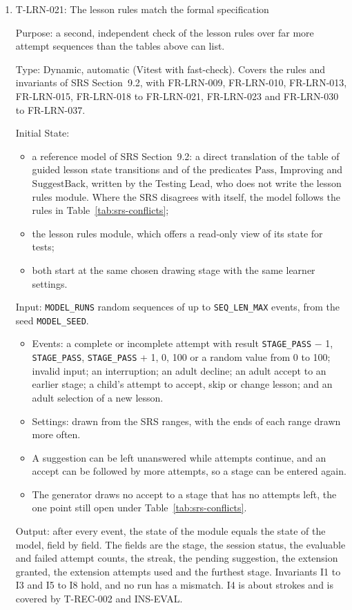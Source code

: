 \documentclass[12pt, titlepage]{article}
\newcommand{\testitem}[1]{\item #1\par\nopagebreak}
\begin{document}
\begin{enumerate}
\testitem{T-LRN-021: The lesson rules match the formal specification}

Purpose: a second, independent check of the lesson rules over far more
attempt sequences than the tables above can list.

Type: Dynamic, automatic (Vitest with fast-check). Covers the rules and
invariants of SRS Section~9.2, with FR-LRN-009, FR-LRN-010, FR-LRN-013,
FR-LRN-015, FR-LRN-018 to FR-LRN-021, FR-LRN-023 and FR-LRN-030 to
FR-LRN-037.

Initial State:
\begin{itemize}
\item a reference model of SRS Section~9.2: a direct translation of the
table of guided lesson state transitions and of the predicates
$\mathrm{Pass}$, $\mathrm{Improving}$ and
$\mathrm{SuggestBack}$, written by the Testing Lead, who does not
write the lesson rules module. Where the SRS disagrees with itself, the
model follows the rules in Table~\ref{tab:srs-conflicts};
\item the lesson rules module, which offers a read-only view of its state
for tests;
\item both start at the same chosen drawing stage with the same learner
settings.
\end{itemize}

Input: \texttt{MODEL\_RUNS} random sequences of up to
\texttt{SEQ\_LEN\_MAX} events, from the seed \texttt{MODEL\_SEED}.
\begin{itemize}
\item Events: a complete or incomplete attempt with result
\texttt{STAGE\_PASS} $-$ 1, \texttt{STAGE\_PASS}, \texttt{STAGE\_PASS} + 1,
0, 100 or a random value from 0 to 100; invalid input; an interruption; an
adult decline; an adult accept to an earlier stage; a child's attempt to
accept, skip or change lesson; and an adult selection of a new lesson.
\item Settings: drawn from the SRS ranges, with the ends of each range
drawn more often.
\item A suggestion can be left unanswered while attempts continue, and an
accept can be followed by more attempts, so a stage can be entered again.
\item The generator draws no accept to a stage that has no attempts left,
the one point still open under Table~\ref{tab:srs-conflicts}.
\end{itemize}

Output: after every event, the state of the module equals the state of the
model, field by field. The fields are the stage, the session status, the
evaluable and failed attempt counts, the streak, the pending suggestion,
the extension granted, the extension attempts used and the furthest stage.
Invariants I1 to I3 and I5 to I8 hold, and no run has a mismatch. I4 is
about strokes and is covered by T-REC-002 and INS-EVAL.


\end{enumerate}
\end{document}
